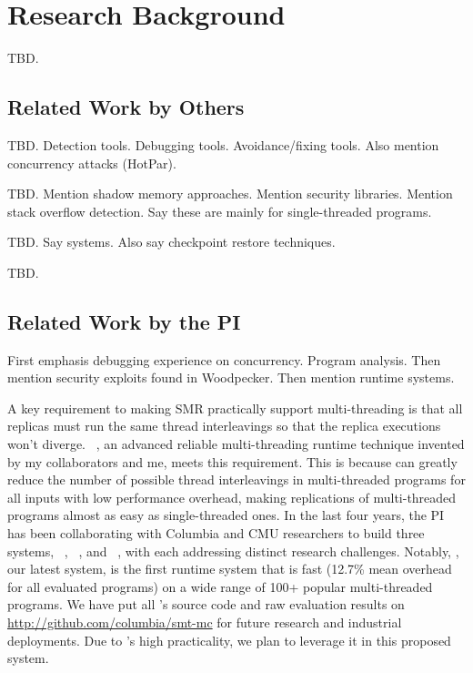 
\section{Research Background} \label{sec:related}

TBD.

\subsection{Related Work by Others} \label{sec:others-work}

 TBD.
Detection tools.
Debugging tools.
Avoidance/fixing tools.
Also mention concurrency attacks (HotPar).

 TBD.
Mention shadow memory approaches.
Mention security libraries.
Mention stack overflow detection.
Say these are mainly for single-threaded programs.

 TBD.
Say systems.
Also say checkpoint restore techniques.

 TBD.



\subsection{Related Work by the PI} \label{sec:my-work}

First emphasis debugging experience on concurrency. Program analysis.
Then mention security exploits found in Woodpecker.
Then mention runtime systems.

A key requirement to making SMR practically support multi-threading is that all 
replicas must run the same thread interleavings so that the replica executions 
won't diverge. \smt~\cite{smt:cacm}, an advanced reliable multi-threading 
runtime technique invented by my collaborators and me, meets this requirement. 
This is because \smt can greatly reduce the number of possible thread 
interleavings in multi-threaded programs for all inputs with low performance 
overhead, making replications of multi-threaded programs almost as easy as 
single-threaded ones. In the last four years, the PI has been collaborating 
with Columbia and CMU researchers to build three \smt systems, 
\tern~\cite{cui:tern:osdi10}, \peregrine~\cite{peregrine:sosp11}, and 
\parrot~\cite{parrot:sosp13}, with each addressing distinct research 
challenges. Notably, \parrot, our latest system, is the first \smt runtime 
system that is fast (12.7\% mean overhead for all evaluated programs) on a wide 
range of 100+ popular multi-threaded programs. We have 
put all \parrot's source code and raw evaluation results on 
\url{http://github.com/columbia/smt-mc} for future research and industrial 
deployments. Due to \parrot's high practicality, we plan to leverage it in this 
proposed \msmr system.

